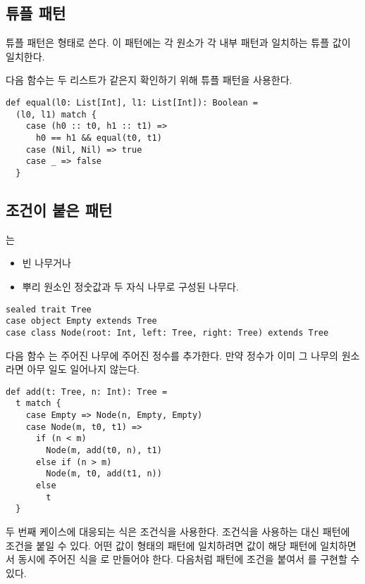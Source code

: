 \subsection{튜플 패턴}

튜플 패턴은  형태로 쓴다. 이 패턴에는 각
원소가 각 내부 패턴과 일치하는 튜플 값이 일치한다.

다음 함수는 두 리스트가 같은지 확인하기 위해 튜플 패턴을 사용한다.

\begin{verbatim}
def equal(l0: List[Int], l1: List[Int]): Boolean =
  (l0, l1) match {
    case (h0 :: t0, h1 :: t1) =>
      h0 == h1 && equal(t0, t1)
    case (Nil, Nil) => true
    case _ => false
  }
\end{verbatim}

\subsection{조건이 붙은 패턴}

는

\begin{itemize}
\item 빈 나무거나
\item 뿌리 원소인 정숫값과 두 자식 나무로 구성된 나무다.
\end{itemize}

\begin{verbatim}
sealed trait Tree
case object Empty extends Tree
case class Node(root: Int, left: Tree, right: Tree) extends Tree
\end{verbatim}

다음 함수 는 주어진 나무에 주어진 정수를 추가한다. 만약 정수가 이미 그
나무의 원소라면 아무 일도 일어나지 않는다.

\begin{verbatim}
def add(t: Tree, n: Int): Tree =
  t match {
    case Empty => Node(n, Empty, Empty)
    case Node(m, t0, t1) =>
      if (n < m)
        Node(m, add(t0, n), t1)
      else if (n > m)
        Node(m, t0, add(t1, n))
      else
        t
  }
\end{verbatim}

두 번째 케이스에 대응되는 식은 조건식을 사용한다. 조건식을 사용하는 대신 패턴에
조건을 붙일 수 있다. 어떤 값이  형태의 패턴에
일치하려면 값이 해당 패턴에 일치하면서 동시에 주어진 식을 로 만들어야
한다. 다음처럼 패턴에 조건을 붙여서 를 구현할 수 있다.

